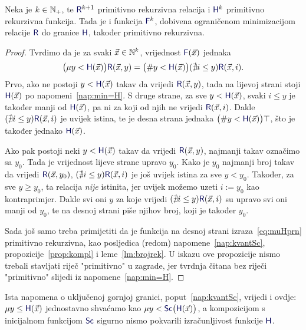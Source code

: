 \begin{propozicija}\label{prop:muHprn}
Neka je $k\in{\mathbb N}_+$, te $\f R^{k+1}$\! primitivno rekurzivna relacija i $\f H^k$ primitivno rekurzivna funkcija. Tada je i funkcija $\f F^k$\!, dobivena ograničenom minimizacijom relacije $\f R$ do granice $\f H$, također primitivno rekurzivna.
\end{propozicija}
\begin{proof}
Tvrdimo da je za svaki $\vec x\in{\mathbb N}^k$, vrijednost $\f F(\vec x)$ jednaka
    \begin{equation}\label{eq:muHprn}
        \bigl(\mu y<\f H(\vec x)\bigr)\f R(\vec x,y)
        =
        \bigl(\# y<\f H(\vec x)\bigr)(\nexists i\le y)\f R(\vec x,i).
    \end{equation}
Prvo, ako ne postoji $y<\f H(\vec x)$ takav da vrijedi $\f R(\vec x,y)$, tada na lijevoj strani stoji $\f H(\vec x)$ po napomeni~\ref{nap:min=H}. S druge strane, za sve $y<\f H(\vec x)$, svaki $i\le y$ je također manji od $\f H(\vec x)$, pa ni za koji od njih ne vrijedi $\f R(\vec x,i)$. Dakle $(\nexists i\le y)\f R(\vec x,i)$ je uvijek istina, te je desna strana jednaka $\bigl(\#y<\f H(\vec x)\bigr)\top$, što je također jednako $\f H(\vec x)$.
    
Ako pak postoji neki $y<\f H(\vec x)$ takav da vrijedi $\f R(\vec x,y)$, najmanji takav označimo sa $y_0$. Tada je vrijednost lijeve strane upravo $y_0$. Kako je $y_0$ najmanji broj takav da vrijedi $\f R(\vec x,y_0)$, $(\nexists i\le y)\f R(\vec x,i)$ je još uvijek istina za sve $y<y_0$. Također, za sve $y\ge y_0$, ta relacija \emph{nije} istinita, jer uvijek možemo uzeti $i:=y_0$ kao kontraprimjer. Dakle svi oni $y$ za koje vrijedi $(\nexists i\le y)\f R(\vec x,i)$ su upravo svi oni manji od $y_0$, te na desnoj strani piše njihov broj, koji je također $y_0$.
    
Sada još samo treba primijetiti da je funkcija na desnoj strani izraza~\eqref{eq:muHprn} primitivno rekurzivna, kao posljedica (redom) napomene~\ref{nap:kvantSc}, propozicije~\ref{prop:kompl} i leme~\ref{lm:brojrek}. U iskazu ove propozicije nismo trebali stavljati riječ "primitivno" u zagrade, jer tvrdnja čitana bez riječi "primitivno" slijedi iz napomene~\ref{nap:min=H}.
\end{proof}

\begin{napomena}\label{nap:muSc}
Ista napomena o uključenoj gornjoj granici, poput~\ref{nap:kvantSc}, vrijedi i ovdje:
$\mu y\le\f H(\vec x)$ jednostavno shvaćamo kao $\mu y<\f{Sc}\bigl(\f H(\vec x)\bigr)$, a kompozicijom s inicijalnom funkcijom $\f{Sc}$ sigurno nismo pokvarili izračunljivost funkcije $\f H$.
\end{napomena}